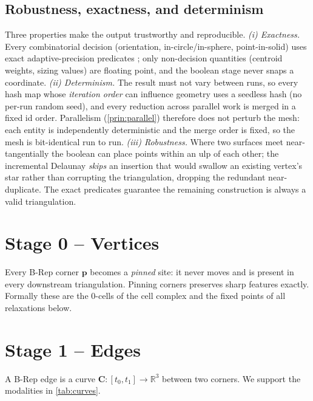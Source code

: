 \documentclass[11pt,a4paper]{article}
\numberwithin{equation}{section}
\newcommand{\R}{\mathbb{R}}
\newcommand{\vv}[1]{\mathbf{#1}}
\begin{document}
\subsection{Robustness, exactness, and determinism}
\label{sec:determinism}
Three properties make the output trustworthy and reproducible.
\emph{(i) Exactness.} Every combinatorial decision (orientation,
in-circle/in-sphere, point-in-solid) uses exact adaptive-precision predicates
\cite{Shewchuk1997}; only non-decision quantities (centroid weights, sizing
values) are floating point, and the boolean stage never snaps a coordinate.
\emph{(ii) Determinism.} The result must not vary between runs, so every hash map
whose \emph{iteration order} can influence geometry uses a seedless hash (no
per-run random seed), and every reduction across parallel work is merged in a
fixed id order. Parallelism (\cref{prin:parallel}) therefore does not perturb the
mesh: each entity is independently deterministic and the merge order is fixed, so
the mesh is bit-identical run to run.
\emph{(iii) Robustness.} Where two surfaces meet near-tangentially the boolean
can place points within an ulp of each other; the incremental Delaunay
\emph{skips} an insertion that would swallow an existing vertex's star rather
than corrupting the triangulation, dropping the redundant near-duplicate. The
exact predicates guarantee the remaining construction is always a valid
triangulation.

\section{Stage 0 -- Vertices}
Every B-Rep corner $\vv{p}$ becomes a \emph{pinned} site: it never moves and is
present in every downstream triangulation. Pinning corners preserves sharp
features exactly. Formally these are the $0$-cells of the cell complex and the
fixed points of all relaxations below.

\section{Stage 1 -- Edges}
\label{sec:edges}

A B-Rep edge is a curve $\vv{C}:[t_0,t_1]\to\R^3$ between two corners. We
support the modalities in \cref{tab:curves}.
\end{document}
